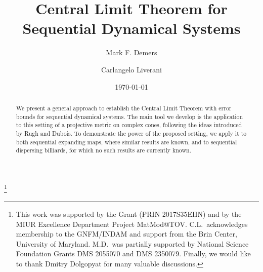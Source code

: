 \documentclass{amsart}
\numberwithin{equation}{section}
\begin{document}
\title{Central Limit Theorem for Sequential Dynamical Systems}
\author{Mark F. Demers}
\address{Mark F. Demers\\
Department of Mathematics\\
 Fairfield University, Fairfield CT 06824, USA.}
\author{Carlangelo Liverani}
\address{Carlangelo Liverani\\
Dipartimento di Matematica\\
II Universit\`{a} di Roma (Tor Vergata)\\
Via della Ricerca Scientifica, 00133 Roma, Italy.
}
\address{\vskip-16pt \noindent Mathematics Department\\
University of Maryland\\
4176 Campus Drive - William E. Kirwan Hall\\
College Park, MD 20742-4015}
\date{\today}%
\vspace*{-.5\baselineskip}
\begin{abstract}
We present a general approach to establish the Central Limit Theorem with error bounds for sequential dynamical systems.  The main tool we develop is the application to this setting of a projective metric on complex cones, following
the ideas introduced by Rugh and Dubois.
To demonstrate the power of the proposed setting, we apply it to both sequential expanding maps, where similar results are known, and to sequential dispersing billiards, for which no such results are currently known.
\end{abstract}
\thanks{This work was supported by the Grant (PRIN 2017S35EHN) and by the MIUR Excellence Department Project MatMod@TOV. C.L.~acknowledges membership to the GNFM/INDAM and support from the Brin Center, University of Maryland.  M.D.~was partially supported by National Science Foundation Grants DMS 2055070 and DMS 2350079. Finally, we would like to thank Dmitry Dolgopyat for many valuable discussions.}
\maketitle

\tableofcontents
\end{document}
